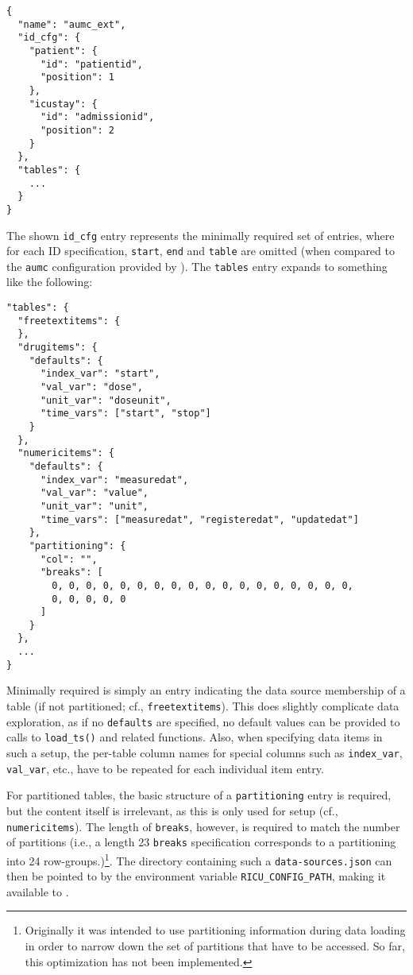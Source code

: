 \documentclass[
  notitle]{jss}
\begin{document}
\begin{verbatim}
{
  "name": "aumc_ext",
  "id_cfg": {
    "patient": {
      "id": "patientid",
      "position": 1
    },
    "icustay": {
      "id": "admissionid",
      "position": 2
    }
  },
  "tables": {
    ...
  }
}
\end{verbatim}

The shown \texttt{id\_cfg} entry represents the minimally required set
of entries, where for each ID specification, \texttt{start},
\texttt{end} and \texttt{table} are omitted (when compared to the
\texttt{aumc} configuration provided by ). The \texttt{tables}
entry expands to something like the following:

\begin{verbatim}
"tables": {
  "freetextitems": {
  },
  "drugitems": {
    "defaults": {
      "index_var": "start",
      "val_var": "dose",
      "unit_var": "doseunit",
      "time_vars": ["start", "stop"]
    }
  },
  "numericitems": {
    "defaults": {
      "index_var": "measuredat",
      "val_var": "value",
      "unit_var": "unit",
      "time_vars": ["measuredat", "registeredat", "updatedat"]
    },
    "partitioning": {
      "col": "",
      "breaks": [
        0, 0, 0, 0, 0, 0, 0, 0, 0, 0, 0, 0, 0, 0, 0, 0, 0, 0,
        0, 0, 0, 0, 0
      ]
    }
  },
  ...
}
\end{verbatim}

Minimally required is simply an entry indicating the data source
membership of a table (if not partitioned; cf., \texttt{freetextitems}).
This does slightly complicate data exploration, as if no
\texttt{defaults} are specified, no default values can be provided to
calls to \texttt{load\_ts()} and related functions. Also, when
specifying data items in such a setup, the per-table column names for
special columns such as \texttt{index\_var}, \texttt{val\_var}, etc.,
have to be repeated for each individual item entry.

For partitioned tables, the basic structure of a \texttt{partitioning}
entry is required, but the content itself is irrelevant, as this is only
used for setup (cf., \texttt{numericitems}). The length of
\texttt{breaks}, however, is required to match the number of partitions
(i.e., a length 23 \texttt{breaks} specification corresponds to a
partitioning into 24 row-groups.)\footnote{Originally it was intended to
  use partitioning information during data loading in order to narrow
  down the set of partitions that have to be accessed. So far, this
  optimization has not been implemented.}. The directory containing such
a \texttt{data-sources.json} can then be pointed to by the environment
variable \texttt{RICU\_CONFIG\_PATH}, making it available to .
\end{document}
